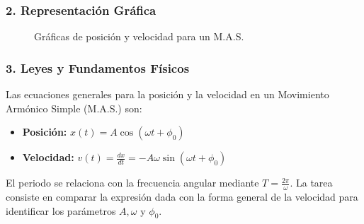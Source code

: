 \subsubsection*{2. Representación Gráfica}
\begin{figure}[H]
    \centering
    \caption{Gráficas de posición y velocidad para un M.A.S.}
\end{figure}

\subsubsection*{3. Leyes y Fundamentos Físicos}
Las ecuaciones generales para la posición y la velocidad en un Movimiento Armónico Simple (M.A.S.) son:
\begin{itemize}
    \item \textbf{Posición:} $x(t) = A \cos(\omega t + \phi_0)$
    \item \textbf{Velocidad:} $v(t) = \frac{dx}{dt} = -A\omega \sin(\omega t + \phi_0)$
\end{itemize}
El periodo se relaciona con la frecuencia angular mediante $T = \frac{2\pi}{\omega}$.
La tarea consiste en comparar la expresión dada con la forma general de la velocidad para identificar los parámetros $A, \omega$ y $\phi_0$.

